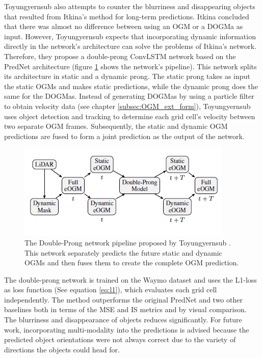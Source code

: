 Toyungyernsub \cite{toyungyernsub2020double} also attempts to counter the blurriness and disappearing objects that resulted from Itkina's \cite{itkina2019dynamic} method for long-term predictions. Itkina \cite{itkina2019dynamic} concluded that there was almost no difference between using an \gls{OGM} or a \gls{DOGMa} as input. However, Toyungyernsub \cite{toyungyernsub2020double} expects that incorporating dynamic information directly in the network's architecture can solve the problems of Itkina's \cite{itkina2019dynamic} network. Therefore, they propose a double-prong \gls{ConvLSTM} network based on the PredNet architecture (figure \ref{fig:double_prong} shows the network's pipeline). This network splits its architecture in static and a dynamic prong. The static prong takes as input the static \glspl{OGM} and makes static predictions, while the dynamic prong does the same for the \glspl{DOGMa}. Instead of generating \glspl{DOGMa} by using a particle filter to obtain velocity data (see chapter \ref{subsec:OGM_ext_form}), Toyungyernsub \cite{toyungyernsub2020double} uses object detection and tracking to determine each grid cell's velocity between two separate \gls{OGM} frames. Subsequently, the static and dynamic \gls{OGM} predictions are fused to form a joint prediction as the output of the network. 

\begin{figure}[h]
	\centering
	\includegraphics[width=0.7\linewidth]{Figures/Methods/Double_Prong}
	\caption{The Double-Prong network pipeline proposed by Toyungyernsub \cite{toyungyernsub2020double}. This network separately predicts the future static and dynamic \glspl{OGM} and then fuses them to create the complete \gls{OGM} prediction.}
	\label{fig:double_prong}
\end{figure}

The double-prong network is trained on the Waymo \cite{sun2020scalability} dataset and uses the L1-loss as loss function (See equation \ref{eq:l1}), which evaluates each grid cell independently. The method outperforms the original PredNet and two other baselines both in terms of the \gls{MSE} and \gls{IS} metrics and by visual comparison. The blurriness and disappearance of objects reduces significantly. For future work, incorporating multi-modality into the predictions is advised because the predicted object orientations were not always correct due to the variety of directions the objects could head for. \\


